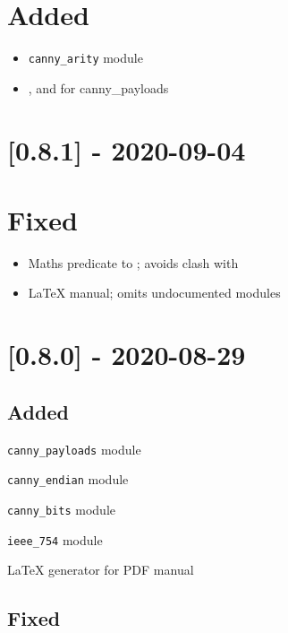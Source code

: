 \section{Added}

\begin{itemize}
    \item \verb$canny_arity$ module
    \item {},  and  for canny_payloads
\end{itemize}

\section{[0.8.1] - 2020-09-04}

\section{Fixed}

\begin{itemize}
    \item Maths predicate  to ; avoids clash with 
    \item LaTeX manual; omits undocumented modules
\end{itemize}

\section{[0.8.0] - 2020-08-29}

\subsection{Added}

\begin{shortlist}
    \item \verb$canny_payloads$ module
    \item \verb$canny_endian$ module
    \item \verb$canny_bits$ module
    \item \verb$ieee_754$ module
    \item LaTeX generator for PDF manual
\end{shortlist}

\subsection{Fixed}

